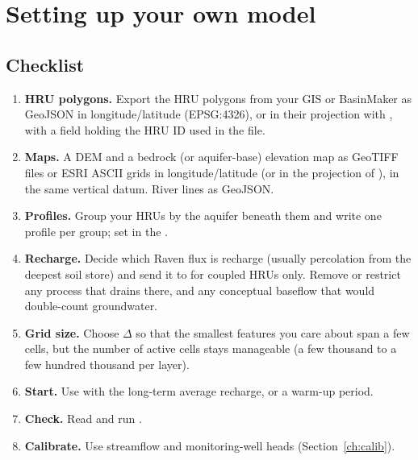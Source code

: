 \section{Setting up your own model}\label{ch:ownmodel}
\subsection{Checklist}
\begin{enumerate}
\item \textbf{HRU polygons.} Export the HRU polygons from your GIS or BasinMaker as GeoJSON in longitude/latitude
(EPSG:4326), or in their projection with , with a field holding the HRU ID used in the  file.
\item \textbf{Maps.} A DEM and a bedrock (or aquifer-base) elevation map as GeoTIFF files or ESRI ASCII grids in
longitude/latitude (or in the projection of ), in the same vertical datum. River lines as GeoJSON.
\item \textbf{Profiles.} Group your HRUs by the aquifer beneath them and write one profile per group; set
 in the .
\item \textbf{Recharge.} Decide which Raven flux is recharge (usually percolation from the deepest soil store) and send it
to  for coupled HRUs only. Remove or restrict any process that drains  there, and any
conceptual baseflow that would double-count groundwater.
\item \textbf{Grid size.} Choose $\Delta$ so that the smallest features you care about span a few cells, but the number of
active cells stays manageable (a few thousand to a few hundred thousand per layer).
\item \textbf{Start.} Use  with the long-term average recharge, or a warm-up period.
\item \textbf{Check.} Read  and run .
\item \textbf{Calibrate.} Use streamflow and monitoring-well heads (Section~\ref{ch:calib}).
\end{enumerate}


